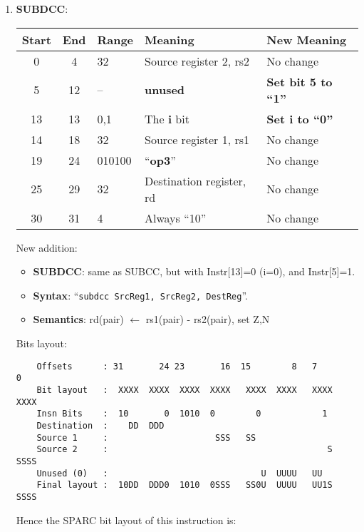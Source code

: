 \begin{enumerate}
\item \textbf{SUBDCC}:\\
  \begin{center}
    \begin{tabular}[p]{|c|c|l|l|l|}
      \hline
      \textbf{Start} & \textbf{End} & \textbf{Range} & \textbf{Meaning} &
                                                                          \textbf{New Meaning}\\
      \hline
      0 & 4 & 32 & Source register 2, rs2 & No change \\
      5 & 12 & -- & \textbf{unused} & \textbf{Set bit 5 to ``1''} \\
      13 & 13 & 0,1 & The \textbf{i} bit & \textbf{Set i to ``0''} \\
      14 & 18 & 32 & Source register 1, rs1 & No change \\
      19 & 24 & 010100 & ``\textbf{op3}'' & No change \\
      25 & 29 & 32 & Destination register, rd & No change \\
      30 & 31 & 4 & Always ``10'' & No change \\
      \hline
    \end{tabular}
  \end{center}
  New addition:
  \begin{itemize}
  \item []\textbf{SUBDCC}: same as SUBCC, but with Instr[13]=0 (i=0), and
    Instr[5]=1.
  \item []\textbf{Syntax}: ``\texttt{subdcc  SrcReg1, SrcReg2, DestReg}''.
  \item []\textbf{Semantics}: rd(pair) $\leftarrow$ rs1(pair) - rs2(pair), set Z,N
  \end{itemize}
  Bits layout:
\begin{verbatim}
    Offsets      : 31       24 23       16  15        8   7        0
    Bit layout   :  XXXX  XXXX  XXXX  XXXX   XXXX  XXXX   XXXX  XXXX
    Insn Bits    :  10       0  1010  0        0            1       
    Destination  :    DD  DDD                                       
    Source 1     :                     SSS   SS
    Source 2     :                                           S  SSSS
    Unused (0)   :                              U  UUUU   UU        
    Final layout :  10DD  DDD0  1010  0SSS   SS0U  UUUU   UU1S  SSSS
\end{verbatim}

  Hence the SPARC bit layout of this instruction is:


\end{enumerate}

